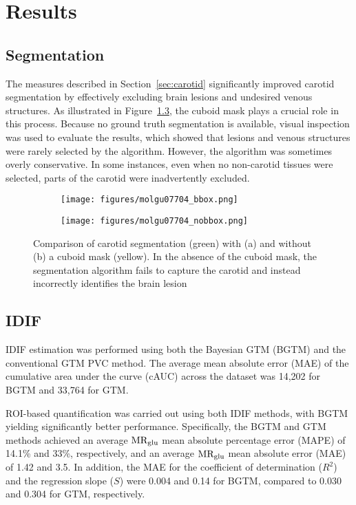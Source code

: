 \chapter{Results}
\section{Segmentation}
The measures described in Section~\ref{sec:carotid} significantly improved carotid segmentation by effectively excluding brain lesions and undesired venous structures.
As illustrated in Figure~\ref{fig:seg_compare}, the cuboid mask plays a crucial role in this process.
Because no ground truth segmentation is available, visual inspection was used to evaluate the results, which showed that lesions and venous structures were rarely selected by the algorithm.
However, the algorithm was sometimes overly conservative.
In some instances, even when no non-carotid tissues were selected, parts of the carotid were inadvertently excluded.

\begin{figure}[h]
	\centering
	\begin{subfigure}{0.45\textwidth}
		\texttt{[image: figures/molgu07704\_bbox.png]}
		\caption{}
		\label{subfig:seg_bbox}
	\end{subfigure}
	\begin{subfigure}{0.45\textwidth}
		\texttt{[image: figures/molgu07704\_nobbox.png]}
		\caption{}
		\label{subfig:seg_nobbox}
	\end{subfigure}
	\caption{Comparison of carotid segmentation (green) with (a) and without (b) a cuboid mask (yellow). In the absence of the cuboid mask, the segmentation algorithm fails to capture the carotid and instead incorrectly identifies the brain lesion}
	\label{fig:seg_compare}
\end{figure}

\section{IDIF}
IDIF estimation was performed using both the Bayesian GTM (BGTM) and the conventional GTM PVC method.
The average mean absolute error (MAE) of the cumulative area under the curve (cAUC) across the dataset was 14,202 for BGTM and 33,764 for GTM.

ROI-based quantification was carried out using both IDIF methods, with BGTM yielding significantly better performance.
Specifically, the BGTM and GTM methods achieved an average \(\text{MR}_{\text{glu}}\) mean absolute percentage error (MAPE) of 14.1\% and 33\%, respectively, and an average \(\text{MR}_{\text{glu}}\) mean absolute error (MAE) of 1.42 and 3.5.
In addition, the MAE for the coefficient of determination (\(R^2\)) and the regression slope (\(S\)) were 0.004 and 0.14 for BGTM, compared to 0.030 and 0.304 for GTM, respectively.


